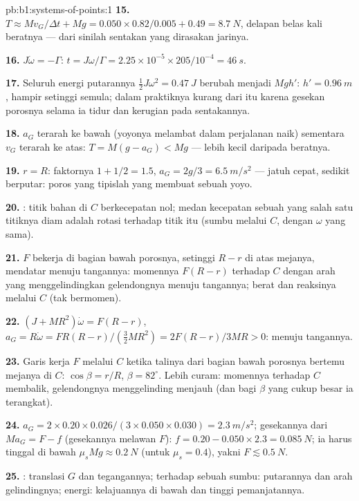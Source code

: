 \begin{solution}{pb:b1:systems-of-points:1}
\textbf{15.} $T \approx Mv_G/\Delta t + Mg = 0.050 \times 0.82/0.005 + 0.49 =
\qty{8.7}{N}$, delapan belas kali beratnya --- dari sinilah sentakan yang dirasakan
jarinya.

\textbf{16.} $J\dot\omega = -\Gamma$: $t = J\omega/\Gamma = 2.25\times10^{-5} \times
205/10^{-4} = \qty{46}{s}$.

\textbf{17.} Seluruh energi putarannya $\tfrac12 J\omega^2 = \qty{0.47}{J}$ berubah
menjadi $Mgh'$: $h' = \qty{0.96}{m}$, hampir setinggi semula; dalam praktiknya kurang
dari itu karena gesekan porosnya selama ia tidur dan kerugian pada
sentakannya.

\textbf{18.} $a_G$ terarah ke bawah (yoyonya melambat dalam perjalanan naik) sementara
$v_G$ terarah ke atas: $T = M(g - a_G) < Mg$ --- lebih kecil daripada beratnya.

\textbf{19.} $r = R$: faktornya $1 + 1/2 = 1.5$, $a_G = 2g/3 = \qty{6.5}{m/s^2}$
--- jatuh cepat, sedikit berputar: poros yang tipislah yang membuat sebuah yoyo.

\textbf{20.} : titik bahan di $C$ berkecepatan
nol; medan kecepatan sebuah  yang salah satu titiknya diam adalah
rotasi terhadap titik itu (sumbu melalui $C$, dengan $\omega$ yang sama).

\textbf{21.} $F$ bekerja di bagian bawah porosnya, setinggi $R - r$ di atas
mejanya, mendatar menuju tangannya: momennya $F(R - r)$ terhadap $C$ dengan
arah yang menggelindingkan gelendongnya menuju tangannya; berat dan
reaksinya melalui $C$ (tak bermomen).

\textbf{22.} $(J + MR^2)\dot\omega = F(R - r)$, $a_G = R\dot\omega = FR(R - r)/
(\tfrac32 MR^2) = 2F(R - r)/3MR > 0$: menuju tangannya.

\textbf{23.} Garis kerja $F$ melalui $C$ ketika talinya
dari bagian bawah porosnya bertemu mejanya di $C$: $\cos\beta = r/R$,
$\beta = 82^\circ$. Lebih curam: momennya terhadap $C$ membalik, gelendongnya menggelinding
menjauh (dan bagi $\beta$ yang cukup besar ia terangkat).

\textbf{24.} $a_G = 2 \times 0.20 \times 0.026/(3 \times 0.050 \times 0.030) =
\qty{2.3}{m/s^2}$; gesekannya dari $Ma_G = F - f$ (gesekannya melawan $F$):
$f = 0.20 - 0.050 \times 2.3 = \qty{0.085}{N}$; ia harus tinggal di bawah $\mu_sMg
\approx \qty{0.2}{N}$ (untuk $\mu_s = 0.4$), yakni $F \lesssim \qty{0.5}{N}$.

\textbf{25.} : translasi $G$ dan tegangannya;
 terhadap sebuah sumbu: putarannya dan arah gelindingnya;
energi: kelajuannya di bawah dan tinggi pemanjatannya.
\end{solution}
